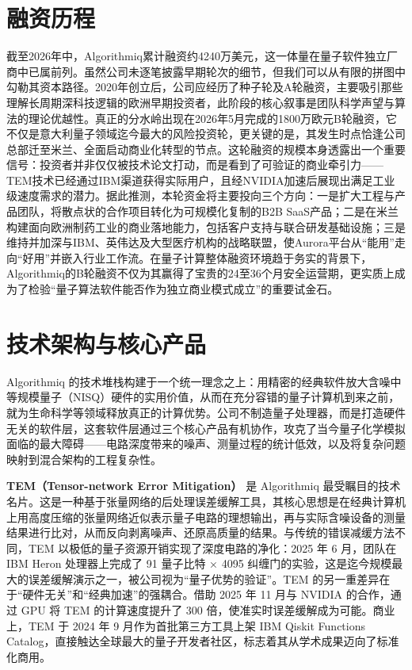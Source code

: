 \documentclass[11pt,a4paper]{ctexart}
\begin{document}
\section{融资历程}
截至2026年中，Algorithmiq累计融资约4240万美元，这一体量在量子软件独立厂商中已属前列。虽然公司未逐笔披露早期轮次的细节，但我们可以从有限的拼图中勾勒其资本路径。2020年创立后，公司应经历了种子轮及A轮融资，主要吸引那些理解长周期深科技逻辑的欧洲早期投资者，此阶段的核心叙事是团队科学声望与算法的理论优越性。真正的分水岭出现在2026年5月完成的1800万欧元B轮融资，它不仅是意大利量子领域迄今最大的风险投资轮，更关键的是，其发生时点恰逢公司总部迁至米兰、全面启动商业化转型的节点。这轮融资的规模本身透露出一个重要信号：投资者并非仅仅被技术论文打动，而是看到了可验证的商业牵引力——TEM技术已经通过IBM渠道获得实际用户，且经NVIDIA加速后展现出满足工业级速度需求的潜力。据此推测，本轮资金将主要投向三个方向：一是扩大工程与产品团队，将散点状的合作项目转化为可规模化复制的B2B SaaS产品；二是在米兰构建面向欧洲制药工业的商业落地能力，包括客户支持与联合研发基础设施；三是维持并加深与IBM、英伟达及大型医疗机构的战略联盟，使Aurora平台从“能用”走向“好用”并嵌入行业工作流。在量子计算整体融资环境趋于务实的背景下，Algorithmiq的B轮融资不仅为其赢得了宝贵的24至36个月安全运营期，更实质上成为了检验“量子算法软件能否作为独立商业模式成立”的重要试金石。

\section{技术架构与核心产品}
Algorithmiq 的技术堆栈构建于一个统一理念之上：用精密的经典软件放大含噪中等规模量子（NISQ）硬件的实用价值，从而在充分容错的量子计算机到来之前，就为生命科学等领域释放真正的计算优势。公司不制造量子处理器，而是打造硬件无关的软件层，这套软件层通过三个核心产品有机协作，攻克了当今量子化学模拟面临的最大障碍——电路深度带来的噪声、测量过程的统计低效，以及将复杂问题映射到混合架构的工程复杂性。

\textbf{TEM（Tensor-network Error Mitigation）} 是 Algorithmiq 最受瞩目的技术名片。这是一种基于张量网络的后处理误差缓解工具，其核心思想是在经典计算机上用高度压缩的张量网络近似表示量子电路的理想输出，再与实际含噪设备的测量结果进行比对，从而反向剥离噪声、还原高质量的结果。与传统的错误减缓方法不同，TEM 以极低的量子资源开销实现了深度电路的净化：2025 年 6 月，团队在 IBM Heron 处理器上完成了 91 量子比特 × 4095 纠缠门的实验，这是迄今规模最大的误差缓解演示之一，被公司视为“量子优势的验证”。TEM 的另一重差异在于“硬件无关”和“经典加速”的强耦合。借助 2025 年 11 月与 NVIDIA 的合作，通过 GPU 将 TEM 的计算速度提升了 300 倍，使准实时误差缓解成为可能。商业上，TEM 于 2024 年 9 月作为首批第三方工具上架 IBM Qiskit Functions Catalog，直接触达全球最大的量子开发者社区，标志着其从学术成果迈向了标准化商用。
\end{document}
